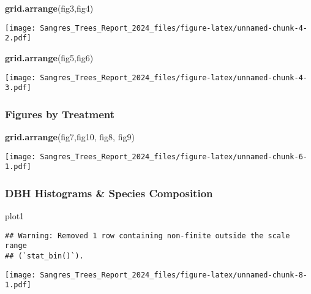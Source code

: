 \documentclass[
]{article}
\newenvironment{Shaded}{\begin{snugshade}}{\end{snugshade}}
\newcommand{\FunctionTok}[1]{\textcolor[rgb]{0.13,0.29,0.53}{\textbf{#1}}}
\newcommand{\NormalTok}[1]{#1}
\begin{document}
\begin{Shaded}
\begin{Highlighting}[]
\FunctionTok{grid.arrange}\NormalTok{(fig3,fig4)}
\end{Highlighting}
\end{Shaded}

\texttt{[image: Sangres\_Trees\_Report\_2024\_files/figure-latex/unnamed-chunk-4-2.pdf]}

\begin{Shaded}
\begin{Highlighting}[]
\FunctionTok{grid.arrange}\NormalTok{(fig5,fig6)}
\end{Highlighting}
\end{Shaded}

\texttt{[image: Sangres\_Trees\_Report\_2024\_files/figure-latex/unnamed-chunk-4-3.pdf]}

\hypertarget{figures-by-treatment}{%
\subsubsection{Figures by Treatment}\label{figures-by-treatment}}

\begin{Shaded}
\begin{Highlighting}[]
\FunctionTok{grid.arrange}\NormalTok{(fig7,fig10, fig8, fig9)}
\end{Highlighting}
\end{Shaded}

\texttt{[image: Sangres\_Trees\_Report\_2024\_files/figure-latex/unnamed-chunk-6-1.pdf]}

\hypertarget{dbh-histograms-species-composition}{%
\subsubsection{DBH Histograms \& Species
Composition}\label{dbh-histograms-species-composition}}

\begin{Shaded}
\begin{Highlighting}[]
\NormalTok{plot1}
\end{Highlighting}
\end{Shaded}

\begin{verbatim}
## Warning: Removed 1 row containing non-finite outside the scale range
## (`stat_bin()`).
\end{verbatim}

\texttt{[image: Sangres\_Trees\_Report\_2024\_files/figure-latex/unnamed-chunk-8-1.pdf]}
\end{document}
